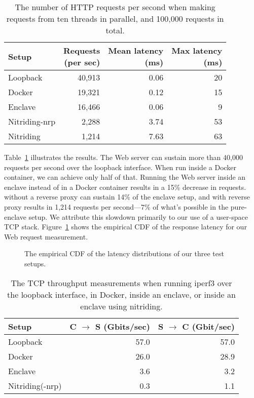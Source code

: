 \begin{table}[t]
    \centering
    \begin{tabular}{l r r r}
    \toprule
      Setup & \makecell[r]{Requests\\(per sec)} &
              \makecell[r]{Mean latency\\(ms)} &
              \makecell[r]{Max latency\\(ms)} \\
    \midrule
      Loopback      & 40,913 &  0.06 & 20 \\
      Docker        & 19,321 &  0.12 & 15 \\
      Enclave       & 16,466 &  0.06 &  9 \\
      Nitriding-nrp &  2,288 &  3.74 & 53 \\
      Nitriding     &  1,214 &  7.63 & 63 \\
    \bottomrule
    \end{tabular}
    \caption{The number of HTTP requests per second when making requests from
    ten threads in parallel, and 100,000 requests in total.}%
    \label{tab:latency-msmts}
\end{table}

Table~\ref{tab:latency-msmts} illustrates the results.  The Web server can
sustain more than 40,000 requests per second over the loopback interface.  When
run inside a Docker container, we can achieve only half of that.  Running the
Web server inside an enclave instead of in a Docker container results in a 15\%
decrease in requests.  \Tool{} without a reverse proxy can sustain 14\% of the
enclave setup, and \tool{} with reverse proxy results in 1,214 requests per
second---7\% of what's possible in the pure-enclave setup.  We attribute this
slowdown primarily to our use of a user-space TCP stack.
Figure~\ref{fig:latency-cdf} shows the empirical CDF of the response latency
for our Web request measurement.

\begin{figure}[t]
    \centering
    
    \caption{The empirical CDF of the latency distributions of our three test
      setups.}\label{fig:latency-cdf}
\end{figure}

\begin{table}[t]
    \centering
    \begin{tabular}{l r r}
    \toprule
      Setup & C $\rightarrow$ S (Gbits/sec) & S $\rightarrow$ C (Gbit/sec) \\
    \midrule
      Loopback        & 57.0 & 57.0 \\
      Docker          & 26.0 & 28.9 \\
      Enclave         &  3.6 &  3.2 \\
      Nitriding(-nrp) &  0.3 &  1.1 \\
    \bottomrule
    \end{tabular}
    \caption{The TCP throughput measurements when running iperf3 over the
    loopback interface, in Docker, inside an enclave, or inside an enclave using
    nitriding.}%
    \label{tab:iperf3}
\end{table}


